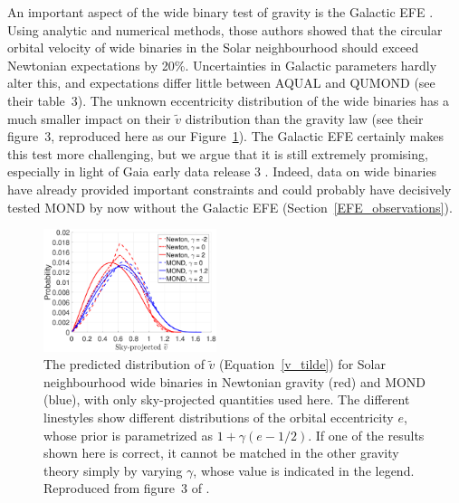 \documentclass[fleqn,usenatbib,useAMS,onecolumn]{mnras} %
\begin{document}
An important aspect of the wide binary test of gravity is the Galactic EFE \citep{Banik_2018_Centauri}. Using analytic and numerical methods, those authors showed that the circular orbital velocity of wide binaries in the Solar neighbourhood should exceed Newtonian expectations by 20\%. Uncertainties in Galactic parameters hardly alter this, and expectations differ little between AQUAL and QUMOND (see their table~3). The unknown eccentricity distribution of the wide binaries has a much smaller impact on their $\widetilde{v}$ distribution than the gravity law (see their figure~3, reproduced here as our Figure~\ref{Banik_2018_Centauri_Figure_3_sky}). The Galactic EFE certainly makes this test more challenging, but we argue that it is still extremely promising, especially in light of Gaia early data release 3 \citep{Gaia_2021}. Indeed, data on wide binaries have already provided important constraints and could probably have decisively tested MOND by now without the Galactic EFE (Section~\ref{EFE_observations}).

\begin{figure}
	\centering
	\includegraphics[width=0.45\textwidth]{Banik_2018_Centauri_Figure_3_sky}
	\caption{The predicted distribution of $\widetilde{v}$ (Equation~\ref{v_tilde}) for Solar neighbourhood wide binaries in Newtonian gravity (red) and MOND (blue), with only sky-projected quantities used here. The different linestyles show different distributions of the orbital eccentricity $e$, whose prior is parametrized as $1 + \gamma \left(e - 1/2 \right)$. If one of the results shown here is correct, it cannot be matched in the other gravity theory simply by varying $\gamma$, whose value is indicated in the legend. Reproduced from figure~3 of \citet{Banik_2018_Centauri}.}
	\label{Banik_2018_Centauri_Figure_3_sky}
\end{figure}
\end{document}
